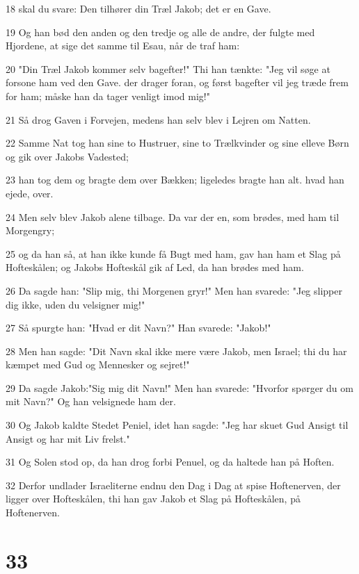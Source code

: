 \par 18 skal du svare: Den tilhører din Træl Jakob; det er en Gave.
\par 19 Og han bød den anden og den tredje og alle de andre, der fulgte med Hjordene, at sige det samme til Esau, når de traf ham:
\par 20 "Din Træl Jakob kommer selv bagefter!" Thi han tænkte: "Jeg vil søge at forsone ham ved den Gave. der drager foran, og først bagefter vil jeg træde frem for ham; måske han da tager venligt imod mig!"
\par 21 Så drog Gaven i Forvejen, medens han selv blev i Lejren om Natten.
\par 22 Samme Nat tog han sine to Hustruer, sine to Trælkvinder og sine elleve Børn og gik over Jakobs Vadested;
\par 23 han tog dem og bragte dem over Bækken; ligeledes bragte han alt. hvad han ejede, over.
\par 24 Men selv blev Jakob alene tilbage. Da var der en, som brødes, med ham til Morgengry;
\par 25 og da han så, at han ikke kunde få Bugt med ham, gav han ham et Slag på Hofteskålen; og Jakobs Hofteskål gik af Led, da han brødes med ham.
\par 26 Da sagde han: "Slip mig, thi Morgenen gryr!" Men han svarede: "Jeg slipper dig ikke, uden du velsigner mig!"
\par 27 Så spurgte han: "Hvad er dit Navn?" Han svarede: "Jakob!"
\par 28 Men han sagde: "Dit Navn skal ikke mere være Jakob, men Israel; thi du har kæmpet med Gud og Mennesker og sejret!"
\par 29 Da sagde Jakob:"Sig mig dit Navn!" Men han svarede: "Hvorfor spørger du om mit Navn?" Og han velsignede ham der.
\par 30 Og Jakob kaldte Stedet Peniel, idet han sagde: "Jeg har skuet Gud Ansigt til Ansigt og har mit Liv frelst."
\par 31 Og Solen stod op, da han drog forbi Penuel, og da haltede han på Hoften.
\par 32 Derfor undlader Israeliterne endnu den Dag i Dag at spise Hoftenerven, der ligger over Hofteskålen, thi han gav Jakob et Slag på Hofteskålen, på Hoftenerven.

\chapter{33}

